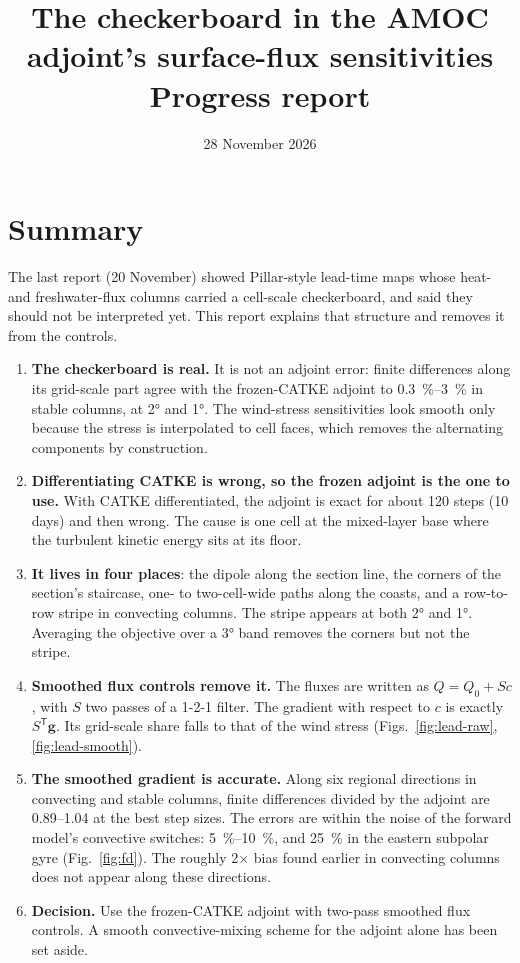 \documentclass[10pt]{article}
\title{\vspace{-2em}\textbf{The checkerboard in the AMOC adjoint's surface-flux sensitivities}\\[2pt]
       \large Progress report\vspace{-0.4em}}
\date{28 November 2026\vspace{-1em}}
\newcommand{\gvec}{\mathbf{g}}
\begin{document}
\maketitle

\section{Summary}

The last report (20 November) showed Pillar-style lead-time maps whose heat- and freshwater-flux columns carried a
cell-scale checkerboard, and said they should not be interpreted yet. This report explains that structure and
removes it from the controls.
\begin{enumerate}
  \item \textbf{The checkerboard is real.} It is not an adjoint error: finite differences along its grid-scale part
        agree with the frozen-CATKE adjoint to \SIrange{0.3}{3}{\percent} in stable columns, at \ang{2} and \ang{1}.
        The wind-stress sensitivities look smooth only because the stress is interpolated to cell faces, which removes
        the alternating components by construction.
  \item \textbf{Differentiating CATKE is wrong, so the frozen adjoint is the one to use.} With CATKE differentiated,
        the adjoint is exact for about 120 steps (10 days) and then wrong. The cause is one cell at the mixed-layer
        base where the turbulent kinetic energy sits at its floor.
  \item \textbf{It lives in four places}: the dipole along the section line, the corners of the section's staircase,
        one- to two-cell-wide paths along the coasts, and a row-to-row stripe in convecting columns. The stripe
        appears at both \ang{2} and \ang{1}. Averaging the objective over a \ang{3} band removes the corners but not
        the stripe.
  \item \textbf{Smoothed flux controls remove it.} The fluxes are written as $Q = Q_0 + S c$, with $S$ two passes of a
        1-2-1 filter. The gradient with respect to $c$ is exactly $S^{\mathsf T}\gvec$. Its grid-scale share falls to
        that of the wind stress (Figs.~\ref{fig:lead-raw}, \ref{fig:lead-smooth}).
  \item \textbf{The smoothed gradient is accurate.} Along six regional directions in convecting and stable columns,
        finite differences divided by the adjoint are 0.89--1.04 at the best step sizes. The errors are within the
        noise of the forward model's convective switches: \SIrange{5}{10}{\percent}, and \SI{25}{\percent} in the
        eastern subpolar gyre (Fig.~\ref{fig:fd}). The roughly 2$\times$ bias found earlier in convecting columns
        does not appear along these directions.
  \item \textbf{Decision.} Use the frozen-CATKE adjoint with two-pass smoothed flux controls. A smooth
        convective-mixing scheme for the adjoint alone has been set aside.
\end{enumerate}
\end{document}
